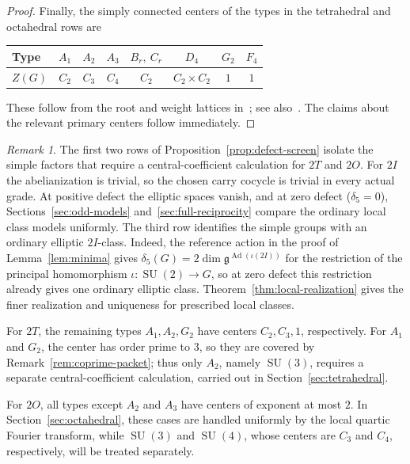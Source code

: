 \documentclass[11pt,a4paper,reqno]{amsart}
\theoremstyle{plain}
\theoremstyle{definition}
\theoremstyle{remark}
\newtheorem{remark}[theorem]{Remark}
\numberwithin{equation}{section}
\DeclareMathOperator{\Ad}{Ad}
\newcommand{\SU}{\operatorname{SU}}
\newcommand{\fg}{\mathfrak g}
\begin{document}
\begin{proof}
Finally, the simply connected centers of the types in the tetrahedral and octahedral rows are
\begin{center}
\begin{tabular}{lccccccc}
\toprule
Type & $A_1$ & $A_2$ & $A_3$ & $B_r,\ C_r$ & $D_4$ & $G_2$ & $F_4$\\
\midrule
$Z(G)$ & $C_2$ & $C_3$ & $C_4$ & $C_2$ & $C_2\times C_2$ & $1$ & $1$\\
\bottomrule
\end{tabular}
\end{center}
These follow from the root and weight lattices in~\cite[Ch.~VI, tables]{Bourbaki};
see also~\cite[21.10]{Milne}. The claims about the relevant primary
centers follow immediately.
\end{proof}

\begin{remark}\label{rem:screening-use}
The first two rows of Proposition~\ref{prop:defect-screen} isolate the simple factors that require a central-coefficient calculation for $2T$ and $2O$. For $2I$ the abelianization is trivial, so the chosen carry cocycle is trivial in every actual grade. At positive defect the elliptic spaces vanish, and at zero defect ($\delta_5=0$), Sections~\ref{sec:odd-models} and~\ref{sec:full-reciprocity} compare the ordinary local class models uniformly. The third row identifies the simple groups with an ordinary elliptic $2I$-class. Indeed, the reference action in the proof of Lemma~\ref{lem:minima} gives $\delta_5(G)=2\dim\fg^{\Ad(\iota(2I))}$ for the restriction of the principal homomorphism $\iota\colon\SU(2)\to G$, so at zero defect this restriction already gives one ordinary elliptic class. Theorem~\ref{thm:local-realization} gives the finer realization and uniqueness for prescribed local classes.

For $2T$, the remaining types $A_1,A_2,G_2$ have centers $C_2,C_3,1$,
respectively. For $A_1$ and $G_2$, the center has order prime to $3$,
so they are covered by Remark~\ref{rem:coprime-packet}; thus only $A_2$, namely $\SU(3)$, requires a separate central-coefficient
calculation, carried out in Section~\ref{sec:tetrahedral}.

For $2O$, all types except $A_2$ and $A_3$ have centers of
exponent at most $2$. In Section~\ref{sec:octahedral}, these cases are
handled uniformly by the local quartic Fourier transform, while
$\SU(3)$ and $\SU(4)$, whose centers are $C_3$ and $C_4$, respectively,
will be treated separately.
\end{remark}
\end{document}
